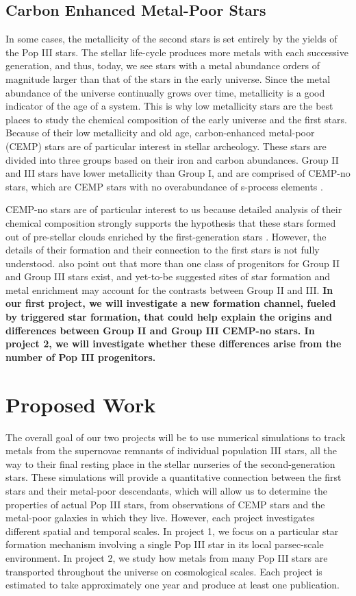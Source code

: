 \documentclass[letterpaper, 12pt]{article}
\begin{document}
\subsection*{Carbon Enhanced Metal-Poor Stars}

In some cases, the metallicity of the second stars is set entirely by the yields of the Pop III stars. The stellar life-cycle produces more metals with each successive generation, and thus, today, we see stars with a metal abundance orders of magnitude larger than that of the stars in the early universe. Since the metal abundance of the universe continually grows over time, metallicity is a good indicator of the age of a system. This is why low metallicity stars are the best places to study the chemical composition of the early universe and the first stars. Because of their low metallicity and old age, carbon-enhanced metal-poor (CEMP) stars are of particular interest in stellar archeology. These stars are divided into three groups based on their iron and carbon abundances. Group II and III stars have lower metallicity than Group I, and are comprised of CEMP-no stars, which are CEMP stars with no overabundance of s-process elements \citep{Maeder2015}. 

CEMP-no stars are of particular interest to us because detailed analysis of their chemical composition strongly supports the hypothesis that these stars formed out of pre-stellar clouds enriched by the first-generation stars \citep{Yoon2016}. However, the details of their formation and their connection to the first stars is not fully understood. \cite{Yoon2016} also point out that more than one class of progenitors for Group II and Group III stars exist, and yet-to-be suggested sites of star formation and metal enrichment may account for the contrasts between Group II and III. \textbf{In our first project, we will investigate a new formation channel, fueled by triggered star formation, that could help explain the origins and differences between Group II and Group III CEMP-no stars. In project 2, we will investigate whether these differences arise from the number of Pop III progenitors.}


\section{Proposed Work}
The overall goal of our two projects will be to use numerical simulations to track metals from the supernovae remnants of individual population III stars, all the way to their final resting place in the stellar nurseries of the second-generation stars. These simulations will provide a quantitative connection between the first stars and their metal-poor descendants, which will allow us to determine the properties of actual Pop III stars, from observations of CEMP stars and the metal-poor galaxies in which they live. However, each project investigates different spatial and temporal scales. In project 1, we focus on a particular star formation mechanism involving a single Pop III star in its local parsec-scale environment. In project 2, we study how metals from many Pop III stars are transported throughout the universe on cosmological scales. Each project is estimated to take approximately one year and produce at least one publication.
\end{document}
